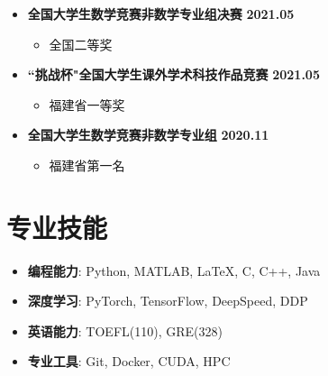 \documentclass{resume}
\begin{document}
\begin{itemize}[leftmargin=0em, itemsep=3pt]
    \item \textbf{\fangsong 全国大学生数学竞赛非数学专业组决赛} \hfill \textbf{2021.05}
    \begin{itemize}[leftmargin=1.5em]
        \item \kaishu 全国二等奖
    \end{itemize}

    \item \textbf{\fangsong ``挑战杯"全国大学生课外学术科技作品竞赛} \hfill \textbf{2021.05}
    \begin{itemize}[leftmargin=1.5em]
        \item \kaishu 福建省一等奖
    \end{itemize}

    \item \textbf{\fangsong 全国大学生数学竞赛非数学专业组} \hfill \textbf{2020.11}
    \begin{itemize}[leftmargin=1.5em]
        \item \kaishu 福建省第一名
    \end{itemize}
    \end{itemize}
\section{\makebox[.75em][c]{\faCogs} \textbf{\fangsong 专业技能}}
\noindent
\begin{minipage}[t]{.5\textwidth}
    \begin{itemize}
    \item \textbf{\kaishu 编程能力}: Python, MATLAB, \LaTeX, C, C++, Java
    \item \textbf{\kaishu 深度学习}: PyTorch, TensorFlow, DeepSpeed, DDP
    \end{itemize}
\end{minipage}
\begin{minipage}[t]{.5\textwidth}
    \begin{itemize}
    \item \textbf{\kaishu 英语能力}: TOEFL(110), GRE(328)
    \item \textbf{\kaishu 专业工具}: Git, Docker, CUDA, HPC
    \end{itemize}
\end{minipage}

\end{document}
